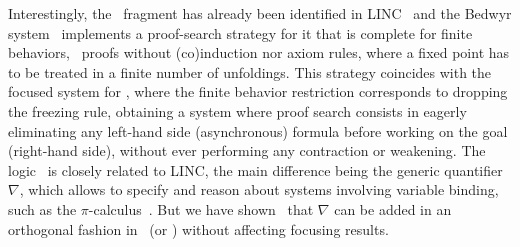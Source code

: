 Interestingly, the \muLJL\ fragment has already been identified in
LINC~\cite{tiu05eshol} and the Bedwyr system~\cite{baelde07cade}
implements a proof-search strategy for it that is complete for finite
behaviors, \ie\ proofs without (co)induction nor axiom rules,
where a fixed point has to be treated in a finite number of unfoldings.
This strategy coincides with the focused
system for \muLJL, where the finite behavior restriction corresponds
to dropping the freezing rule,
obtaining a system where proof search consists in
eagerly eliminating any left-hand side (asynchronous) formula
before working on the goal (right-hand side),
without ever performing any contraction or weakening.
The logic \muLJ\ is closely related to LINC, the main difference being
the generic quantifier $\nabla$, which allows to specify and reason about
systems involving variable binding,
such as the $\pi$-calculus~\cite{tiu05concur}.
But we have shown~\cite{baelde08lfmtp} that $\nabla$ can be added
in an orthogonal fashion in \muLJ\ (or \mumall)
without affecting focusing results.
